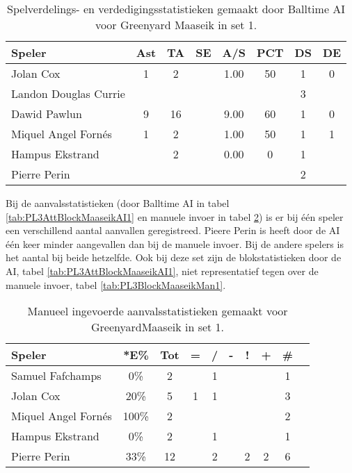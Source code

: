 \begin{table}[ht!]
  \centering
  \scriptsize
  \begin{tabular}{|l|c|c|c|c|c|c|c|} \hline
    \textbf{Speler} & Ast & TA & SE & A/S & PCT & DS & DE \\ \hline
    Jolan Cox & 1 & 2 &  & 1.00 & 50 & 1 & 0 \\
    Landon Douglas Currie &  &  &  &   &   & 3 &   \\
    Dawid Pawlun & 9 & 16 &  & 9.00 & 60 & 1 & 0 \\
    Miquel Angel Fornés & 1 & 2 &  & 1.00 & 50 & 1 & 1 \\
    Hampus Ekstrand &  & 2 &  & 0.00 & 0 & 1 & \\
    Pierre Perin &   &   &   &   &   & 2 &   \\ \hline
  \end{tabular}
  \caption[Spelverdelings- en verdedigingsstatistieken gemaakt door Balltime AI voor Greenyard Maaseik in set 1]{\label{tab:PL3SetDigMaaseikAI1}Spelverdelings- en verdedigingsstatistieken gemaakt door Balltime AI voor Greenyard Maaseik in set 1.}
\end{table}

Bij de aanvalsstatistieken (door Balltime AI in tabel \ref{tab:PL3AttBlockMaaseikAI1} en manuele invoer in tabel \ref{tab:PL3AttMaaseikMan1}) is er bij één speler een verschillend aantal aanvallen geregistreed. Pieere Perin is heeft door de AI één keer minder aangevallen dan bij de manuele invoer. Bij de andere spelers is het aantal bij beide hetzelfde. Ook bij deze set zijn de blokstatistieken door de AI, tabel \ref{tab:PL3AttBlockMaaseikAI1}, niet representatief tegen over de manuele invoer, tabel \ref{tab:PL3BlockMaaseikMan1}.

\begin{table}[ht!]
    \centering
    \scriptsize
    \begin{tabular}{|l|c|c|c|c|c|c|c|c|c|} \hline
        \textbf{Speler} & *E\% & Tot & = & / & - & ! & + & \# \\ \hline
        Samuel Fafchamps & 0\% & 2 &  & 1 &  &  &  & 1 \\ 
        Jolan Cox & 20\% & 5 & 1 & 1 &  &  &  & 3 \\ 
        Miquel Angel Fornés & 100\% & 2 &  &  &  &  &  & 2 \\ 
        Hampus Ekstrand & 0\% & 2 &  & 1 &  &  &  & 1 \\ 
        Pierre Perin & 33\% & 12 &  & 2 &  & 2 & 2 & 6 \\ \hline
    \end{tabular}
    \caption[Manueel ingevoerde aanvalsstatistieken gemaakt Greenyard Maaseik in set 1]{\label{tab:PL3AttMaaseikMan1}Manueel ingevoerde aanvalsstatistieken gemaakt voor GreenyardMaaseik in set 1.}
\end{table}


